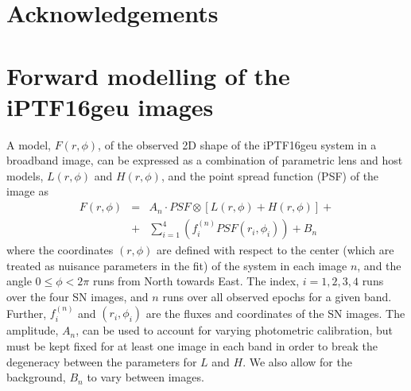 \documentclass[a4paper,fleqn,usenatbib]{mnras}
\newcommand{\geu}{iPTF16geu\xspace}
\begin{document}

\section*{Acknowledgements}









\appendix
\section{Forward modelling of the \geu images}
\label{sec:bgmodel}
A model,  $F(r,\phi)$, of the observed 2D shape of the \geu system in a broadband image, can be expressed as a 
combination of parametric lens and host models, $L(r,\phi)$ and $H(r,\phi)$, and the point spread function (PSF) of the 
image as
\begin{eqnarray*}
	F(r,\phi) & = & A_n\cdot PSF\otimes \left[L(r,\phi) + H(r,\phi)\right] +\\
	& + & \sum\limits_{i=1}^{4}\left( f_{i}^{(n)} PSF(r_i,\phi_i) \right)+ B_n
\end{eqnarray*}
where the coordinates $(r,\phi)$ are defined with respect to the center (which are treated as nuisance parameters in the fit)
of the system in each image $n$, and the angle $0 \leq \phi < 2\pi$ runs from North towards East.  The index, $i=1,2,3,4$ runs 
over the four SN images, and $n$ runs over all observed epochs for a given band.  Further, $f_{i}^{(n)}$ and $(r_i,\phi_i)$ are 
the fluxes and coordinates of the SN images.  The amplitude, $A_n$, can be used to account for varying photometric 
calibration, but must be kept fixed for at least one image in each band in order to break the degeneracy between the  
parameters for $L$ and $H$.  We also allow for the background, $B_n$ to vary between images. 
\end{document}
